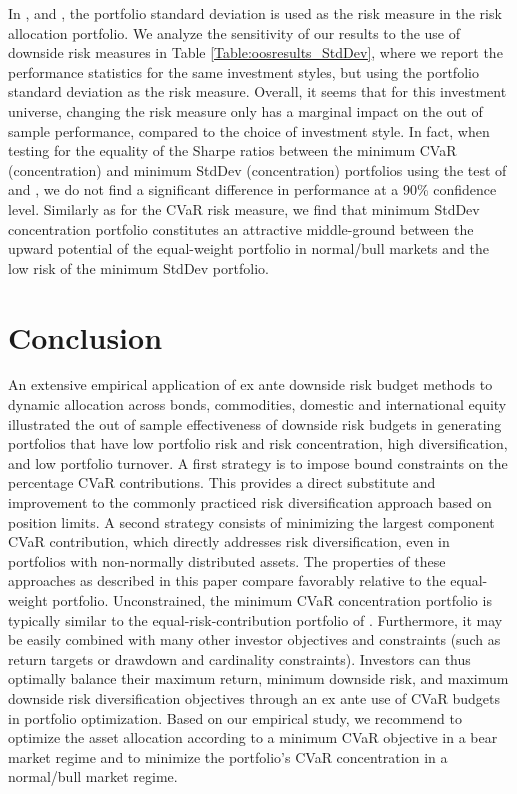 \documentclass[12pt,a4paper]{article}
\begin{document}
In \citet{Maillard2010}, \citet{Qian2005} and \citet{Zhu2010}, the portfolio standard deviation is used as the risk measure in the risk allocation portfolio. We analyze the sensitivity of our results to the use of downside risk measures in Table \ref{Table:oosresults_StdDev}, where we report the performance statistics for the same investment styles, but using the portfolio standard deviation as the risk measure. Overall, it seems that for this investment universe,  changing the risk measure only has a marginal impact on the out of sample performance, compared to the choice of investment style. In fact, when testing for the equality of the Sharpe ratios between the minimum CVaR (concentration) and minimum StdDev (concentration) portfolios using the test of \citet{JobsonKorkie1981} and \citet{Memmel2003}, we do not find a significant difference in performance at a 90\% confidence level.  Similarly as for the CVaR risk measure, we find that minimum StdDev concentration portfolio constitutes an attractive middle-ground between the upward potential of the equal-weight portfolio in normal/bull markets and the low risk of the minimum StdDev portfolio.





\section{Conclusion \label{sec:Conclusion}}

An extensive empirical application of ex ante downside risk budget methods to dynamic allocation across bonds, commodities, domestic and international equity illustrated the out of sample effectiveness of downside risk budgets in generating portfolios that have low portfolio risk and risk concentration, high diversification, and low portfolio turnover. A first strategy is to impose bound constraints on the percentage CVaR contributions. This provides a direct substitute and improvement to the commonly practiced risk diversification approach based on position limits. A second strategy consists of minimizing the largest component CVaR contribution, which directly addresses risk diversification, even in portfolios with non-normally distributed assets. The properties of these approaches as described in this paper compare favorably relative to the equal-weight portfolio. Unconstrained, the minimum CVaR concentration  portfolio is typically similar to the equal-risk-contribution portfolio of \citet{Qian2005}. Furthermore, it may be easily combined with many other investor objectives and constraints (such as return targets or drawdown and cardinality constraints). Investors can thus optimally balance their maximum return, minimum downside risk, and maximum downside risk diversification objectives through an ex ante use of CVaR  budgets in portfolio optimization. Based on our empirical study, we recommend to optimize the asset allocation according to a minimum CVaR objective in a bear market regime and to minimize the portfolio's CVaR concentration in a normal/bull market regime.
\end{document}

